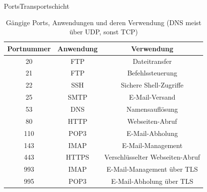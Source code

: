 \begin{frame}[fragile]{\faShip{} Ports}{Transportschicht}
    \begin{table}[H]
        \centering
        \footnotesize
        \begin{tabular}{ccc}
            \textbf{Portnummer} & \textbf{Anwendung} & \textbf{Verwendung}             \\
            \midrule
            20                  & \acrshort{FTP}                & Dateitransfer                   \\
            21                  & \acrshort{FTP}                & Befehlssteuerung                \\
            22                  & \acrshort{SSH}                & Sichere Shell-Zugriffe          \\
            25                  & \acrshort{SMTP}               & E-Mail-Versand                  \\
            53                  & \acrshort{DNS}                & Namensauflösung                 \\
            80                  & \acrshort{HTTP}               & Webseiten-Abruf                 \\
            110                 & \acrshort{POP3}               & E-Mail-Abholung                 \\
            143                 & \acrshort{IMAP}               & E-Mail-Management               \\
            443                 & \acrshort{HTTPS}              & Verschlüsselter Webseiten-Abruf \\
            993                 & \acrshort{IMAP}               & E-Mail-Management über \acrshort{TLS}      \\
            995                 & \acrshort{POP3}               & E-Mail-Abholung über \acrshort{TLS}        \\
        \end{tabular}
        \caption*{Gängige Ports, Anwendungen und deren Verwendung (\acrshort{DNS} meist über \acrshort{UDP}, sonst \acrshort{TCP})}
    \end{table}
\end{frame}

